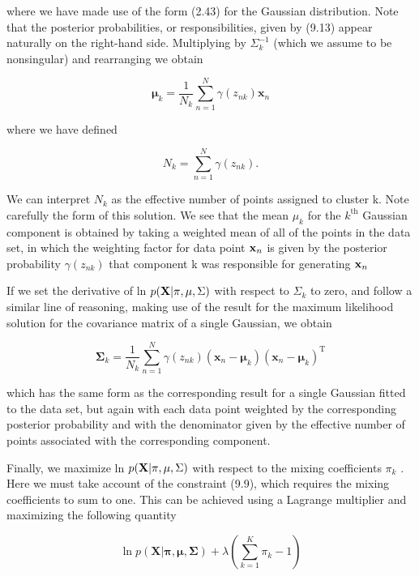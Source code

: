\documentclass[
  10
]{article}
\begin{document}
where we have made use of the form (2.43) for the Gaussian distribution.
Note that the posterior probabilities, or responsibilities, given by
(9.13) appear naturally on the right-hand side. Multiplying by
\(\Sigma _ { k } ^ { - 1 }\) (which we assume to be nonsingular) and
rearranging we obtain

\[
\pmb {\mu} _ {k} = \frac {1}{N _ {k}} \sum_ {n = 1} ^ {N} \gamma (z _ {n k}) \mathbf {x} _ {n}\tag{9.17}
\]

where we have defined

\[
N _ {k} = \sum_ {n = 1} ^ {N} \gamma (z _ {n k}).\tag{9.18}
\]

We can interpret \(N _ { k }\) as the effective number of points
assigned to cluster k. Note carefully the form of this solution. We see
that the mean \(\mu _ { k }\) for the \(k ^ { \mathrm { t h } }\)
Gaussian component is obtained by taking a weighted mean of all of the
points in the data set, in which the weighting factor for data point
\({ \bf x } _ { n }\) is given by the posterior probability
\(\gamma ( z _ { n k } )\) that component k was responsible for
generating \({ \bf x } _ { n }\)

If we set the derivative of ln \(p ( { \bf X } | \pi , \mu , \Sigma )\)
with respect to \(\Sigma _ { k }\) to zero, and follow a similar line of
reasoning, making use of the result for the maximum likelihood solution
for the covariance matrix of a single Gaussian, we obtain

\[
\pmb {\Sigma} _ {k} = \frac {1}{N _ {k}} \sum_ {n = 1} ^ {N} \gamma (z _ {n k}) (\mathbf {x} _ {n} - \pmb {\mu} _ {k}) (\mathbf {x} _ {n} - \pmb {\mu} _ {k}) ^ {\mathrm{T}}\tag{9.19}
\]

which has the same form as the corresponding result for a single
Gaussian fitted to the data set, but again with each data point weighted
by the corresponding posterior probability and with the denominator
given by the effective number of points associated with the
corresponding component.

Finally, we maximize ln \(p ( { \bf X } | \pi , \mu , \Sigma )\) with
respect to the mixing coefficients \(\pi _ { k }\) . Here we must take
account of the constraint (9.9), which requires the mixing coefficients
to sum to one. This can be achieved using a Lagrange multiplier and
maximizing the following quantity

\[
\ln p (\mathbf {X} | \boldsymbol {\pi}, \boldsymbol {\mu}, \boldsymbol {\Sigma}) + \lambda \left(\sum_ {k = 1} ^ {K} \pi_ {k} - 1\right)\tag{9.20}
\]
\end{document}
